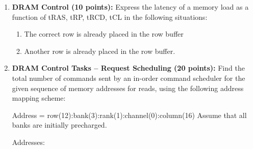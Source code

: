 \documentclass[a4paper, 11pt]{exam}
\begin{document}
\begin{enumerate}
\item \textbf {DRAM Control (10 points): } Express the latency of a memory load as a function of tRAS, tRP, tRCD, tCL in the following situations:

 \begin{enumerate}
 \item  The correct row is already placed in the row buffer
 \item  Another row is already placed in the row buffer.
 \end{enumerate}

\item \textbf {DRAM Control Tasks – Request Scheduling (20 points): }  Find the total number of commands sent by an in-order command scheduler for the given sequence of memory addresses for reads, using the following address mapping scheme:

\hspace{20pt} Address = row(12):bank(3):rank(1):channel(0):column(16)\newline
\hspace{20pt} Assume that all banks are initially precharged.

\center Addresses: \newline

\end{enumerate}
\end{document}
